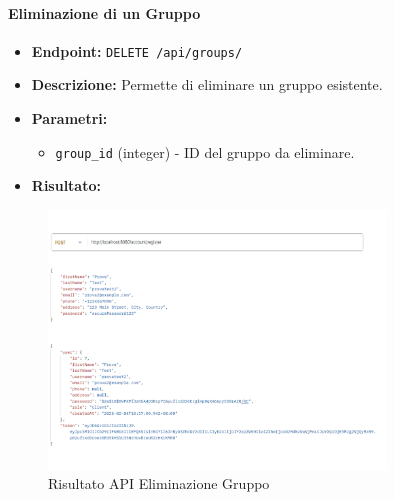 \paragraph{Eliminazione di un Gruppo}
\begin{itemize}
    \item \textbf{Endpoint:} \texttt{DELETE /api/groups/}
    \item \textbf{Descrizione:} Permette di eliminare un gruppo esistente.
    \item \textbf{Parametri:}
    \begin{itemize}
        \item \texttt{group\_id} (integer) - ID del gruppo da eliminare.
    \end{itemize}
    \item \textbf{Risultato:}
\end{itemize}
\begin{figure}[H]
    \centering
    \includegraphics[width=0.8\textwidth]{images/registerapi.png}
    \caption{Risultato API Eliminazione Gruppo}
    \label{fig:api_delete_group}
\end{figure}

